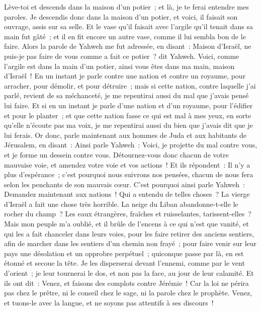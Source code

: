 \begin{multicols}{2}
Lève-toi et descends dans la maison d'un potier~; et là, je te ferai entendre mes paroles.
Je descendis donc dans la maison d'un potier, et voici, il faisait son ouvrage, assis sur sa selle.
Et le vase qu'il faisait avec l'argile qu'il tenait dans sa main fut gâté~; et il en fit encore un autre vase, comme il lui sembla bon de le faire.
Alors la parole de Yahweh me fut adressée, en disant~:
Maison d'Israël, ne puis-je pas faire de vous comme a fait ce potier~? dit Yahweh. Voici, comme l'argile est dans la main d'un potier, ainsi vous êtes dans ma main, maison d'Israël~!
En un instant je parle contre une nation et contre un royaume, pour arracher, pour démolir, et pour détruire~;
mais si cette nation, contre laquelle j'ai parlé, revient de sa méchanceté, je me repentirai aussi du mal que j'avais pensé lui faire.
Et si en un instant je parle d'une nation et d'un royaume, pour l'édifier et pour le planter~;
 et que cette nation fasse ce qui est mal à mes yeux, en sorte qu'elle n'écoute pas ma voix, je me repentirai aussi du bien que j'avais dit que je lui ferais.
Or donc, parle maintenant aux hommes de Juda et aux habitants de Jérusalem, en disant~: Ainsi parle Yahweh~: Voici, je projette du mal contre vous, et je forme un dessein contre vous. Détournez-vous donc chacun de votre mauvaise voie, et amendez votre voie et vos actions~!
Et ils répondent~: Il n'y a plus d'espérance~; c'est pourquoi nous suivrons nos pensées, chacun de nous fera selon les penchants de son mauvais cœur.
C'est pourquoi ainsi parle Yahweh~: Demandez maintenant aux nations~! Qui a entendu de telles choses~? La vierge d'Israël a fait une chose très horrible.
La neige du Liban abandonne-t-elle le rocher du champ~? Les eaux étrangères, fraîches et ruisselantes, tarissent-elles~?
Mais mon peuple m'a oublié, et il brûle de l'encens à ce qui n'est que vanité, et qui les a fait chanceler dans leurs voies, pour les faire retirer des anciens sentiers, afin de marcher dans les sentiers d'un chemin non frayé~;
pour faire venir sur leur pays une désolation et un opprobre perpétuel~; quiconque passe par là, en est étonné et secoue la tête.
Je les disperserai devant l'ennemi, comme par le vent d'orient~; je leur tournerai le dos, et non pas la face, au jour de leur calamité.
Et ils ont dit~: Venez, et faisons des complots contre Jérémie~! Car la loi ne périra pas chez le prêtre, ni le conseil chez le sage, ni la parole chez le prophète. Venez, et tuons-le avec la langue, et ne soyons pas attentifs à ses discours~!

\end{multicols}
